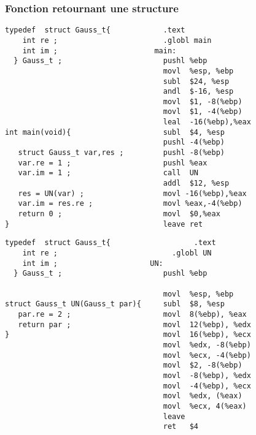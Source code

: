 \begin{frame}[fragile]
  \frametitle{Fonction retournant une structure}%
\begin{verbatim}
typedef  struct Gauss_t{            .text    
    int re ;                        .globl main   
    int im ;                      main:           
  } Gauss_t ;                       pushl %ebp            
                                    movl  %esp, %ebp  
                                    subl  $24, %esp   
                                    andl  $-16, %esp  
                                    movl  $1, -8(%ebp)
                                    movl  $1, -4(%ebp)
                                    leal  -16(%ebp),%eax       
int main(void){                     subl  $4, %esp    
                                    pushl -4(%ebp)    
   struct Gauss_t var,res ;         pushl -8(%ebp)    
   var.re = 1 ;                     pushl %eax               
   var.im = 1 ;                     call  UN 
                                    addl  $12, %esp   
   res = UN(var) ;                  movl -16(%ebp),%eax
   var.im = res.re ;                movl %eax,-4(%ebp)
   return 0 ;                       movl  $0,%eax
}                                   leave ret              
 \end{verbatim}
\end{frame}
\begin{frame}[fragile]

\begin{verbatim}
typedef  struct Gauss_t{                   .text           
    int re ;                          .globl UN            
    int im ;                     UN:                       
  } Gauss_t ;                       pushl %ebp             

                                    movl  %esp, %ebp       
struct Gauss_t UN(Gauss_t par){     subl  $8, %esp         
   par.re = 2 ;                     movl  8(%ebp), %eax    
   return par ;                     movl  12(%ebp), %edx   
}                                   movl  16(%ebp), %ecx   
                                    movl  %edx, -8(%ebp)       
                                    movl  %ecx, -4(%ebp)   
                                    movl  $2, -8(%ebp)     
                                    movl  -8(%ebp), %edx   
                                    movl  -4(%ebp), %ecx     
                                    movl  %edx, (%eax)     
                                    movl  %ecx, 4(%eax)    
                                    leave                  
                                    ret   $4               
 \end{verbatim}
\end{frame}

